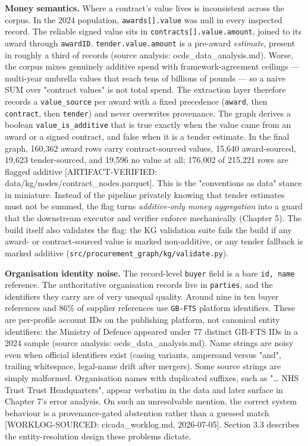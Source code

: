 \textbf{Money semantics.} Where a contract's value lives is inconsistent across the corpus. In the 2024 population, \texttt{awards[].value} was null in every inspected record. The reliable signed value sits in \texttt{contracts[].value.amount}, joined to its award through \texttt{awardID}. \texttt{tender.value.amount} is a pre-award \emph{estimate}, present in roughly a third of records (source analysis: ocds\_data\_analysis.md). Worse, the corpus mixes genuinely additive spend with framework-agreement ceilings --- multi-year umbrella values that reach tens of billions of pounds --- so a naive SUM over "contract values" is not total spend. The extraction layer therefore records a \texttt{value\_source} per award with a fixed precedence (\texttt{award}, then \texttt{contract}, then \texttt{tender}) and never overwrites provenance. The graph derives a boolean \texttt{value\_is\_additive} that is true exactly when the value came from an award or a signed contract, and false when it is a tender estimate. In the final graph, 160,362 award rows carry contract-sourced values, 15,640 award-sourced, 19,623 tender-sourced, and 19,596 no value at all; 176,002 of 215,221 rows are flagged additive [ARTIFACT-VERIFIED: data/kg/nodes/contract\_nodes.parquet]. This is the "conventions as data" stance in miniature. Instead of the pipeline privately knowing that tender estimates must not be summed, the flag turns \emph{additive-only money aggregation} into a guard that the downstream executor and verifier enforce mechanically (Chapter 5). The build itself also validates the flag: the KG validation suite fails the build if any award- or contract-sourced value is marked non-additive, or any tender fallback is marked additive (\texttt{src/procurement\_graph/kg/validate.py}).

\textbf{Organisation identity noise.} The record-level \texttt{buyer} field is a bare \texttt{{id, name}} reference. The authoritative organisation records live in \texttt{parties}, and the identifiers they carry are of very unequal quality. Around nine in ten buyer references and 86\% of supplier references use \texttt{GB-FTS} platform identifiers. These are per-profile account IDs on the publishing platform, not canonical entity identifiers: the Ministry of Defence appeared under 77 distinct GB-FTS IDs in a 2024 sample (source analysis: ocds\_data\_analysis.md). Name strings are noisy even when official identifiers exist (casing variants, ampersand versus "and", trailing whitespace, legal-name drift after mergers). Some source strings are simply malformed. Organisation names with duplicated suffixes, such as "\ldots{} NHS Trust Trust Headquarters", appear verbatim in the data and later surface in Chapter 7's error analysis. On such an unresolvable mention, the correct system behaviour is a provenance-gated abstention rather than a guessed match [WORKLOG-SOURCED: cicada\_worklog.md, 2026-07-05]. Section 3.3 describes the entity-resolution design these problems dictate.

